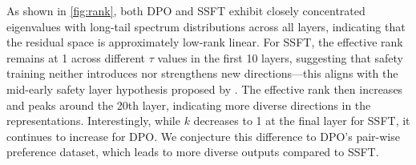 As shown in \autoref{fig:rank}, both DPO and SSFT exhibit closely concentrated eigenvalues with long-tail spectrum distributions across all layers, indicating that the residual space is approximately low-rank linear. For SSFT, the effective rank remains at 1 across different $\tau$ values in the first 10 layers, suggesting that safety training neither introduces nor strengthens new directions—this aligns with the mid-early safety layer hypothesis proposed by \citet{li2024safety}. The effective rank then increases and peaks around the 20th layer, indicating more diverse directions in the representations. Interestingly, while $k$ decreases to 1 at the final layer for SSFT, it continues to increase for DPO. We conjecture this difference to DPO's pair-wise preference dataset, which leads to more diverse outputs compared to SSFT.


    

